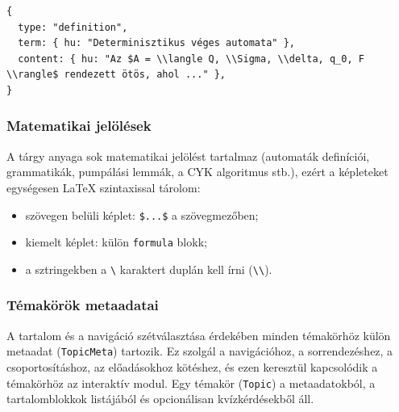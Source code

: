 \begin{lstlisting}
{
  type: "definition",
  term: { hu: "Determinisztikus véges automata" },
  content: { hu: "Az $A = \\langle Q, \\Sigma, \\delta, q_0, F \\rangle$ rendezett ötös, ahol ..." },
}
\end{lstlisting}

\subsubsection{Matematikai jelölések}

A tárgy anyaga sok matematikai jelölést tartalmaz (automaták
definíciói, grammatikák, pumpálási lemmák, a CYK algoritmus stb.),
ezért a képleteket egységesen \LaTeX{} szintaxissal tárolom:

\begin{itemize}
    \item szövegen belüli képlet: \verb|$...$| a szövegmezőben;
    \item kiemelt képlet: külön \texttt{formula} blokk;
    \item a sztringekben a \verb|\| karaktert duplán kell írni
          (\verb|\\|).
\end{itemize}

\subsubsection{Témakörök metaadatai}

A tartalom és a navigáció szétválasztása érdekében minden témakörhöz
külön metaadat (\texttt{TopicMeta}) tartozik. Ez szolgál a
navigációhoz, a sorrendezéshez, a csoportosításhoz, az előadásokhoz
kötéshez, és ezen keresztül kapcsolódik a témakörhöz az
interaktív modul. Egy témakör (\texttt{Topic}) a metaadatokból, a
tartalomblokkok listájából és opcionálisan kvízkérdésekből áll.

